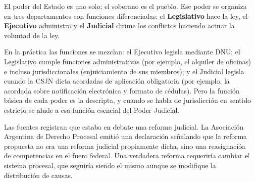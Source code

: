 \documentclass[12pt,oneside]{book}
\begin{document}
El poder del Estado es uno solo; el soberano es el pueblo. Ese poder se organiza en tres departamentos con funciones diferenciadas: el \textbf{Legislativo} hace la ley, el \textbf{Ejecutivo} administra y el \textbf{Judicial} dirime los conflictos haciendo actuar la voluntad de la ley.

En la práctica las funciones se mezclan: el Ejecutivo legisla mediante DNU; el Legislativo cumple funciones administrativas (por ejemplo, el alquiler de oficinas) e incluso jurisdiccionales (enjuiciamiento de sus miembros); y el Judicial legisla cuando la CSJN dicta acordadas de aplicación obligatoria (por ejemplo, la acordada sobre notificación electrónica y formato de cédulas). Pero la función básica de cada poder es la descripta, y cuando se habla de jurisdicción en sentido estricto se alude a esa función esencial del Poder Judicial.

\begin{nota}
Las fuentes registran que estaba en debate una reforma judicial. La Asociación Argentina de Derecho Procesal emitió una declaración señalando que la reforma propuesta no era una reforma judicial propiamente dicha, sino una reasignación de competencias en el fuero federal. Una verdadera reforma requeriría cambiar el sistema procesal, que seguiría siendo el mismo aunque se modifique la distribución de causas.
\end{nota}
\end{document}
